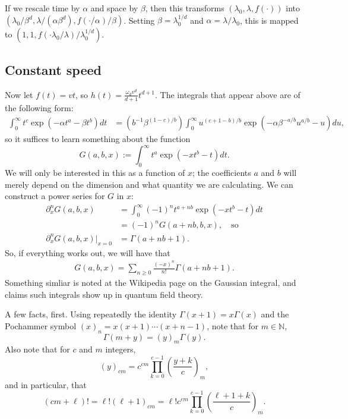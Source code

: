 \documentclass{article}
\newcommand{\N}{\mathbb{N}}
\begin{document}
If we rescale time by $\alpha$ and space by $\beta$, 
then this transforms $(\lambda_0, \lambda, f(\cdot))$ into $(\lambda_0/\beta^d, \lambda/(\alpha \beta^d), f(\cdot/\alpha)/\beta)$.  
Setting $\beta = \lambda_0^{1/d}$ and $\alpha = \lambda / \lambda_0$, this is mapped to $(1,1,f(\cdot \lambda_0/\lambda)/\lambda_0^{1/d})$.

\subsection{Constant speed}

Now let $f(t) = vt$, so $h(t) = \frac{ \omega_d v^d }{ d+1 } t^{d+1}$.
The integrals that appear above are of the following form:
\begin{align}
  \int_0^\infty t^c \exp \left( - \alpha t^a - \beta t^b \right) dt 
            &= \left( b^{-1} \beta^{ (1-c)/b } \right) \int_0^\infty u^{(c+1-b)/b} \exp\left( - \alpha \beta^{-a/b} u^{a/b} - u \right) du ,
\end{align}
so it suffices to learn something about the function
\begin{equation}
    G(a,b,x) := \int_0^\infty  t^a \exp\left( -x t^b - t \right) dt .
\end{equation}
We will only be interested in this as a function of $x$; 
the coefficients $a$ and $b$ will merely depend on the dimension and what quantity we are calculating.
We can construct a power series for $G$ in $x$:
\begin{align}
    \partial_x^n G(a,b,x) &= \int_0^\infty (-1)^n t^{a+nb} \exp\left( -x t^b - t \right) dt \\
            &= (-1)^n G(a+nb,b,x) , \quad \mbox{so} \\
    \partial_x^n G(a,b,x) \vert_{x=0} &= \Gamma(a+nb+1) .
\end{align}
So, if everything works out, we will have that
\begin{align}
    G(a,b,x) = \sum_{n \ge 0} \frac{(-x)^n}{n!} \Gamma(a+nb+1) .
\end{align}
Something simliar is noted at the Wikipedia page on the Gaussian integral, and claims such integrals show up in quantum field theory.


A few facts, first.
Using repeatedly the identity $\Gamma(x+1) = x\Gamma(x)$
and the Pochammer symbol $(x)_n = x(x+1)\cdots(x+n-1)$,
note that for $m \in \N$,
\[
    \Gamma(m+y) = (y)_m \Gamma(y).
\]
Also note that for $c$ and $m$ integers,
\[
    (y)_{cm} = c^{cm} \prod_{k=0}^{c-1} (\frac{y+k}{c})_{m} ,
\]
and in particular, that
\[
    (cm+\ell)! = \ell! (\ell+1)_{cm} = \ell! c^{cm} \prod_{k=0}^{c-1} (\frac{\ell+1+k}{c})_m .
\]
\end{document}
